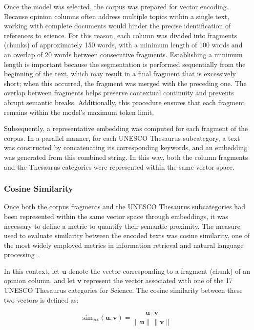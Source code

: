 \documentclass[pdflatex,sn-mathphys-num, iicol]{sn-jnl}
\begin{document}
	Once the model was selected, the corpus was prepared for vector encoding. Because opinion columns often address multiple topics within a single text, working with complete documents would hinder the precise identification of references to science. For this reason, each column was divided into fragments (chunks) of approximately 150 words, with a minimum length of 100 words and an overlap of 20 words between consecutive fragments. Establishing a minimum length is important because the segmentation is performed sequentially from the beginning of the text, which may result in a final fragment that is excessively short; when this occurred, the fragment was merged with the preceding one. The overlap between fragments helps preserve contextual continuity and prevents abrupt semantic breaks. Additionally, this procedure ensures that each fragment remains within the model’s maximum token limit.
	
	Subsequently, a representative embedding was computed for each fragment of the corpus. In a parallel manner, for each UNESCO Thesaurus subcategory, a text was constructed by concatenating its corresponding keywords, and an embedding was generated from this combined string. In this way, both the column fragments and the Thesaurus categories were represented within the same vector space.
	
	\subsubsection{Cosine Similarity}\label{subsubsec:cosine}
	
	Once both the corpus fragments and the UNESCO Thesaurus subcategories had been represented within the same vector space through embeddings, it was necessary to define a metric to quantify their semantic proximity. The measure used to evaluate similarity between the encoded texts was cosine similarity, one of the most widely employed metrics in information retrieval and natural language processing~\cite{jurafsky2025}.
	
	In this context, let $\mathbf{u}$ denote the vector corresponding to a fragment (chunk) of an opinion column, and let $\mathbf{v}$ represent the vector associated with one of the 17 UNESCO Thesaurus categories for Science. The cosine similarity between these two vectors is defined as:
	
	\begin{equation}
		\text{sim}_{\cos}(\mathbf{u}, \mathbf{v}) =
		\frac{\mathbf{u} \cdot \mathbf{v}}
		{\lVert \mathbf{u} \rVert \, \lVert \mathbf{v} \rVert}
		\label{eq:cosine}
	\end{equation}
	
\end{document}
